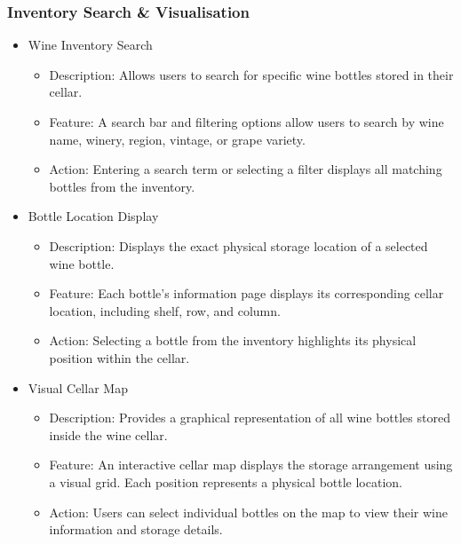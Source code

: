 \documentclass[conference]{IEEEtran}
\begin{document}
\subsubsection{Inventory Search \& Visualisation}
\begin{itemize}
    \item Wine Inventory Search
    \begin{itemize}
        \item Description: Allows users to search for specific wine bottles stored in their cellar.
        \item Feature: A search bar and filtering options allow users to search by wine name, winery, region, vintage, or grape variety.
        \item Action: Entering a search term or selecting a filter displays all matching bottles from the inventory.
    \end{itemize}

    \item Bottle Location Display
    \begin{itemize}
        \item Description: Displays the exact physical storage location of a selected wine bottle.
        \item Feature: Each bottle's information page displays its corresponding cellar location, including shelf, row, and column.
        \item Action: Selecting a bottle from the inventory highlights its physical position within the cellar.
    \end{itemize}

    \item Visual Cellar Map
    \begin{itemize}
        \item Description: Provides a graphical representation of all wine bottles stored inside the wine cellar.
        \item Feature: An interactive cellar map displays the storage arrangement using a visual grid. Each position represents a physical bottle location.
        \item Action: Users can select individual bottles on the map to view their wine information and storage details.
    \end{itemize}
\end{itemize}
\end{document}
